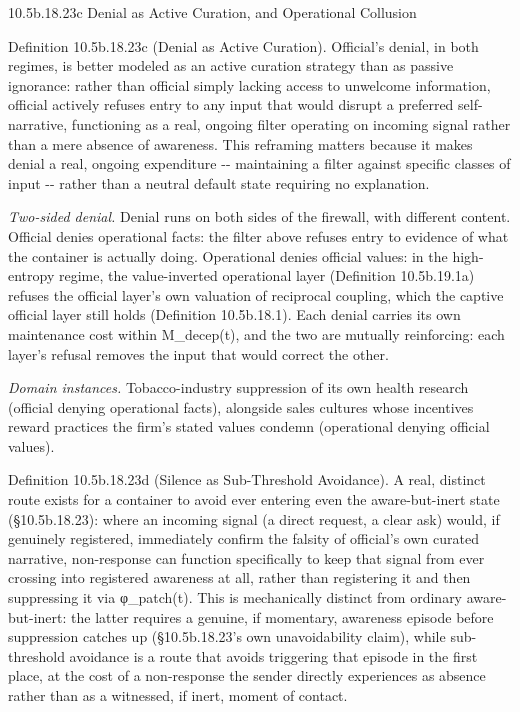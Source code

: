 \documentclass[
]{article}
\begin{document}
10.5b.18.23c Denial as Active Curation, and Operational Collusion

Definition 10.5b.18.23c (Denial as Active Curation). Official's denial,
in both regimes, is better modeled as an active curation strategy than
as passive ignorance: rather than official simply lacking access to
unwelcome information, official actively refuses entry to any input that
would disrupt a preferred self-narrative, functioning as a real, ongoing
filter operating on incoming signal rather than a mere absence of
awareness. This reframing matters because it makes denial a real,
ongoing expenditure -\/- maintaining a filter against specific classes
of input -\/- rather than a neutral default state requiring no
explanation.

\emph{Two-sided denial.} Denial runs on both sides of the firewall, with
different content. Official denies operational facts: the filter above
refuses entry to evidence of what the container is actually doing.
Operational denies official values: in the high-entropy regime, the
value-inverted operational layer (Definition 10.5b.19.1a) refuses the
official layer's own valuation of reciprocal coupling, which the captive
official layer still holds (Definition 10.5b.18.1). Each denial carries
its own maintenance cost within M\_decep(t), and the two are mutually
reinforcing: each layer's refusal removes the input that would correct
the other.

\emph{Domain instances.} Tobacco-industry suppression of its own health
research (official denying operational facts), alongside sales cultures
whose incentives reward practices the firm's stated values condemn
(operational denying official values).

Definition 10.5b.18.23d (Silence as Sub-Threshold Avoidance). A real,
distinct route exists for a container to avoid ever entering even the
aware-but-inert state (§10.5b.18.23): where an incoming signal (a direct
request, a clear ask) would, if genuinely registered, immediately
confirm the falsity of official's own curated narrative, non-response
can function specifically to keep that signal from ever crossing into
registered awareness at all, rather than registering it and then
suppressing it via φ\_patch(t). This is mechanically distinct from
ordinary aware-but-inert: the latter requires a genuine, if momentary,
awareness episode before suppression catches up (§10.5b.18.23's own
unavoidability claim), while sub-threshold avoidance is a route that
avoids triggering that episode in the first place, at the cost of a
non-response the sender directly experiences as absence rather than as a
witnessed, if inert, moment of contact.
\end{document}
